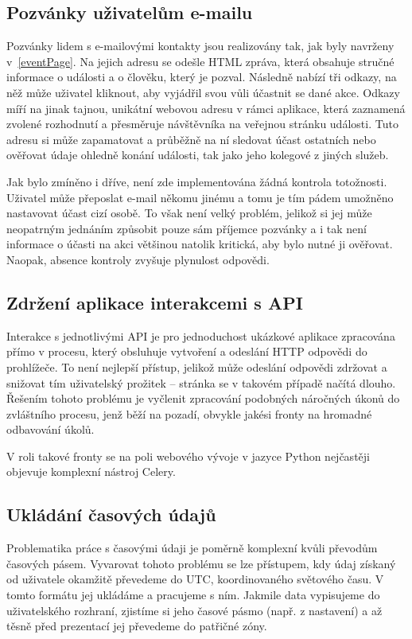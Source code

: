 \documentclass[12pt,oneside,final]{fithesis2}
\begin{document}
\subsection{Pozvánky uživatelům e-mailu}
Pozvánky lidem s e-mailovými kontakty jsou realizovány tak, jak byly navrženy v~\ref{eventPage}. Na jejich adresu se odešle HTML zpráva, která obsahuje stručné informace o události a o člověku, který je pozval. Následně nabízí tři odkazy, na něž může uživatel kliknout, aby vyjádřil svou vůli účastnit se dané akce. Odkazy míří na jinak tajnou, unikátní webovou adresu v rámci aplikace, která zaznamená zvolené rozhodnutí a přesměruje návštěvníka na veřejnou stránku události. Tuto adresu si může zapamatovat a průběžně na ní sledovat účast ostatních nebo ověřovat údaje ohledně konání události, tak jako jeho kolegové z jiných služeb.

Jak bylo zmíněno i dříve, není zde implementována žádná kontrola totožnosti. Uživatel může přeposlat e-mail někomu jinému a tomu je tím pádem umožněno nastavovat účast cizí osobě. To však není velký problém, jelikož si jej může neopatrným jednáním způsobit pouze sám příjemce pozvánky a i tak není informace o účasti na akci většinou natolik kritická, aby bylo nutné ji ověřovat. Naopak, absence kontroly zvyšuje plynulost odpovědi.

\subsection{Zdržení aplikace interakcemi s API}
Interakce s jednotlivými API je pro jednoduchost ukázkové aplikace zpracována přímo v procesu, který obsluhuje vytvoření a odeslání HTTP odpovědi do prohlížeče. To není nejlepší přístup, jelikož může odeslání odpovědi zdržovat a snižovat tím uživatelský prožitek -- stránka se v takovém případě načítá dlouho. Řešením tohoto problému je vyčlenit zpracování podobných náročných úkonů do zvláštního procesu, jenž běží na pozadí, obvykle jakési fronty na hromadné odbavování úkolů.

V roli takové fronty se na poli webového vývoje v jazyce Python nejčastěji objevuje komplexní nástroj Celery.

\subsection{Ukládání časových údajů}
Problematika práce s časovými údaji je poměrně komplexní kvůli převodům časových pásem. Vyvarovat tohoto problému se lze přístupem, kdy údaj získaný od uživatele okamžitě převedeme do UTC, koordinovaného světového času. V tomto formátu jej ukládáme a pracujeme s ním. Jakmile data vypisujeme do uživatelského rozhraní, zjistíme si jeho časové pásmo (např. z nastavení) a až těsně před prezentací jej převedeme do patřičné zóny.
\end{document}
